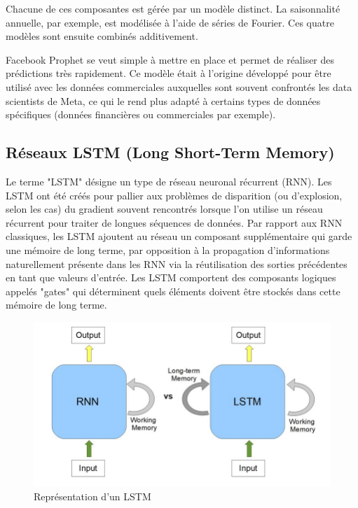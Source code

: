 \documentclass[french]{article}
\begin{document}
    Chacune de ces composantes est gérée par un modèle distinct. La saisonnalité annuelle, par exemple, est modélisée à l'aide de séries de Fourier. Ces quatre modèles sont ensuite combinés additivement.
    
    Facebook Prophet se veut simple à mettre en place et permet de réaliser des prédictions très rapidement. Ce modèle était à l'origine développé pour être utilisé avec les données commerciales auxquelles sont souvent confrontés les data scientists de Meta, ce qui le rend plus adapté à certains types de données spécifiques (données financières ou commerciales par exemple). 
    
    \subsection{Réseaux LSTM (Long Short-Term Memory)}

    Le terme "LSTM" désigne un type de réseau neuronal récurrent (RNN). Les LSTM ont été créés pour pallier aux problèmes de disparition (ou d'explosion, selon les cas) du gradient souvent rencontrés lorsque l'on utilise un réseau récurrent pour traiter de longues séquences de données.
    Par rapport aux RNN classiques, les LSTM ajoutent au réseau un composant supplémentaire qui garde une mémoire de long terme, par opposition à la propagation d'informations naturellement présente dans les RNN via la réutilisation des sorties précédentes en tant que valeurs d'entrée. Les LSTM comportent des composants logiques appelés "gates" qui déterminent quels éléments doivent être stockés dans cette mémoire de long terme.

    
    \begin{figure}[h!]
        \includegraphics[width=12cm]{RNNvsLSTM}
        \centering
        \caption{Représentation d'un LSTM}
        \centering
    \end{figure}
\end{document}

